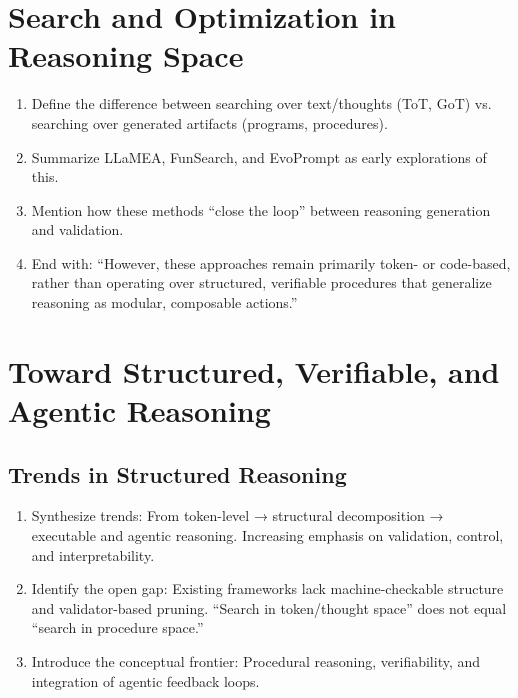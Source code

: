 \documentclass[project]{bsu-cs}  %
\begin{document}
\section{Search and Optimization in Reasoning Space}\label{sec:opt}
\begin{enumerate}
    \item Define the difference between searching over text/thoughts (ToT, GoT) vs. searching over generated artifacts (programs, procedures).

    \item Summarize LLaMEA, FunSearch, and EvoPrompt as early explorations of this.

    \item Mention how these methods “close the loop” between reasoning generation and validation.

    \item End with: “However, these approaches remain primarily token- or code-based, rather than operating over structured, verifiable procedures that generalize reasoning as modular, composable actions.”
\end{enumerate}
% 
%
%
% 
\section{Toward Structured, Verifiable, and Agentic Reasoning}\label{sec:struct}
\subsection{Trends in Structured Reasoning}
\begin{enumerate}
    \item Synthesize trends: From token-level → structural decomposition → executable and agentic reasoning. Increasing emphasis on validation, control, and interpretability.

    \item Identify the open gap: Existing frameworks lack machine-checkable structure and validator-based pruning. “Search in token/thought space” does not equal “search in procedure space.”

    \item Introduce the conceptual frontier: Procedural reasoning, verifiability, and integration of agentic feedback loops.

\end{enumerate}
% 
\end{document}
